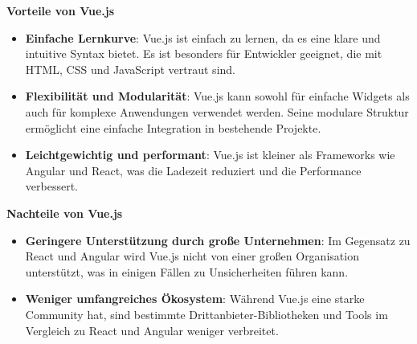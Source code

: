 \textbf{Vorteile von Vue.js}
\begin{itemize}
	\item \textbf{Einfache Lernkurve}: Vue.js ist einfach zu lernen, da es eine klare und intuitive Syntax bietet. Es ist besonders für Entwickler geeignet, die mit HTML, CSS und JavaScript vertraut sind.\textit{\cite{madurapperuma2022state, vuejs}}
	
	\item \textbf{Flexibilität und Modularität}: Vue.js kann sowohl für einfache Widgets als auch für komplexe Anwendungen verwendet werden. Seine modulare Struktur ermöglicht eine einfache Integration in bestehende Projekte.\textit{\cite{rathinam2022analysis, vuejs}}
	
	\item \textbf{Leichtgewichtig und performant}: Vue.js ist kleiner als Frameworks wie Angular und React, was die Ladezeit reduziert und die Performance verbessert.\textit{\cite{shetty2020review, vuejs}}
\end{itemize}

\textbf{Nachteile von Vue.js}
\begin{itemize}
	\item \textbf{Geringere Unterstützung durch große Unternehmen}: Im Gegensatz zu React und Angular wird Vue.js nicht von einer großen Organisation unterstützt, was in einigen Fällen zu Unsicherheiten führen kann.\textit{\cite{rathinam2022analysis, vue_blog}}
	
	\item \textbf{Weniger umfangreiches Ökosystem}: Während Vue.js eine starke Community hat, sind bestimmte Drittanbieter-Bibliotheken und Tools im Vergleich zu React und Angular weniger verbreitet.\textit{\cite{hutagikar2020analysis, vue_blog}}
\end{itemize}
